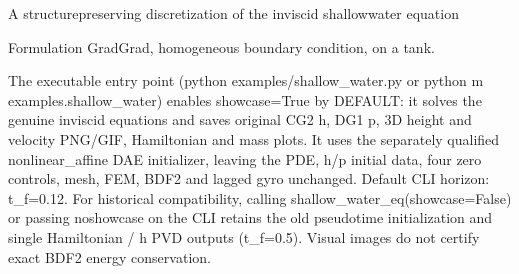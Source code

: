 \documentclass[letterpaper,10pt,english]{sphinxmanual}
\begin{document}

\begin{fulllineitems}
\label{\detokenize{examples/shallow_water:examples.shallow_water.shallow_water_eq}}
\pysigstartsignatures
\pysiglinewithargsret
{}
{\sphinxparamcomma {}\sphinxparamcomma {}\sphinxparamcomma {}\sphinxparamcomma {}\sphinxparamcomma {}\sphinxparamcomma {}}
{}
\pysigstopsignatures
\sphinxAtStartPar
A structure\sphinxhyphen{}preserving discretization of the inviscid shallow\sphinxhyphen{}water equation

\sphinxAtStartPar
Formulation Grad\sphinxhyphen{}Grad, homogeneous boundary condition, on a tank.

\sphinxAtStartPar
The executable entry point (python examples/shallow\_water.py or
python \sphinxhyphen{}m examples.shallow\_water) enables showcase=True by DEFAULT:
it solves the genuine inviscid equations and saves original CG2 h,
DG1 p, 3\sphinxhyphen{}D height and velocity PNG/GIF, Hamiltonian and mass plots.
It uses the separately qualified nonlinear\_affine DAE initializer,
leaving the PDE, h/p initial data, four zero controls, mesh, FEM,
BDF2 and lagged gyro unchanged. Default CLI horizon: t\_f=0.12.
For historical compatibility, calling shallow\_water\_eq(showcase=False)
or passing \textendash{}no\sphinxhyphen{}showcase on the CLI retains the old pseudo\sphinxhyphen{}time
initialization and single Hamiltonian / h PVD outputs (t\_f=0.5).
Visual images do not certify exact BDF2 energy conservation.

\end{fulllineitems}

\end{document}
